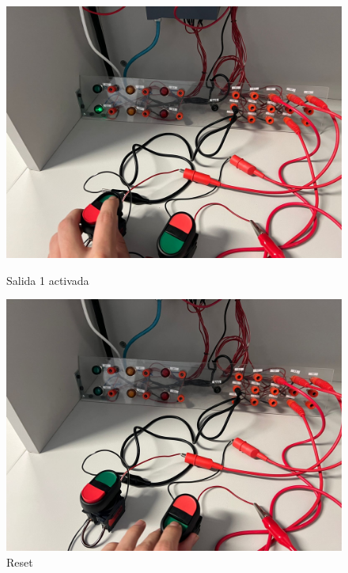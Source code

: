 \documentclass[12pt]{report}
\begin{document}
\begin{enumerate}
\begin{figure}[H]
    \centering
    \begin{minipage}[b]{0.45\textwidth}
      \centering
      \includegraphics[width=\textwidth]{screenshots/imagen_3.jpg}
      \caption{Salida 1 activada}
      \label{fig:salidas_2}
    \end{minipage}
    \hfill
    \begin{minipage}[b]{0.45\textwidth}
      \centering
      \includegraphics[width=\textwidth]{screenshots/imagen_2.jpg}
      \caption{Reset}
      \label{fig:apagado}
    \end{minipage}
  \end{figure}
\end{enumerate}
\end{document}
